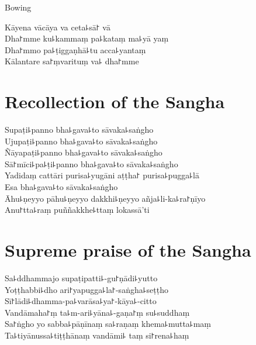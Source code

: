 \clearpage

\begin{instruction}%
  Bowing
\end{instruction}

Kāyena vācāya va ceta꜕sā꜓ vā\\
Dha꜓mme ku꜕kammaṃ pa꜕kataṃ ma꜕yā yaṃ\\
Dha꜓mmo pa꜕ṭiggaṇhā꜕tu acca꜕yantaṃ\\
Kālantare sa꜓ṃvarituṃ va꜕ dha꜓mme

\chapter{Recollection of the Sangha}%

\begin{leader}
\end{leader}

Supaṭi꜕panno bha꜕gava꜕to sāvaka꜕saṅgho\\
Ujupaṭi꜕panno bha꜕gava꜕to sāvaka꜕saṅgho\\
Ñāyapaṭi꜕panno bha꜕gava꜕to sāvaka꜕saṅgho\\
Sā꜓mīci꜕pa꜕ṭi꜕panno bha꜕gava꜕to sāvaka꜕saṅgho\\
Yadidaṃ cattāri purisa꜕yugāni aṭṭha꜓ purisa꜕pugga꜕lā\\
Esa bha꜕gava꜕to sāvaka꜕saṅgho\\
Āhu꜕ṇeyyo pāhu꜕ṇeyyo dakkhi꜕ṇeyyo añja꜕li-ka꜕ra꜓ṇīyo\\
Anu꜓tta꜕raṃ puññakkhe꜕ttaṃ lokassā'ti

\chapter{Supreme praise of the Sangha}%

\begin{leader}
\end{leader}

Sa꜕ddhammajo supaṭipatti꜕-gu꜓ṇādi꜕yutto\\
Yoṭṭhabbi꜕dho ari꜓yapugga꜕la꜓-saṅgha꜕seṭṭho\\
Sī꜓lādi꜕dhamma-pa꜕varāsa꜕ya꜓-kāya꜕-citto\\
Vandāmaha꜓ṃ ta꜕m-ari꜕yāna꜕-gaṇa꜓ṃ su꜕suddhaṃ\\
Sa꜓ṅgho yo sabba꜕pāṇīnaṃ sa꜕raṇaṃ khema꜕mutta꜕maṃ\\
Ta꜕tiyānussa꜕tiṭṭhānaṃ vandāmi꜕ taṃ si꜓rena꜕haṃ

